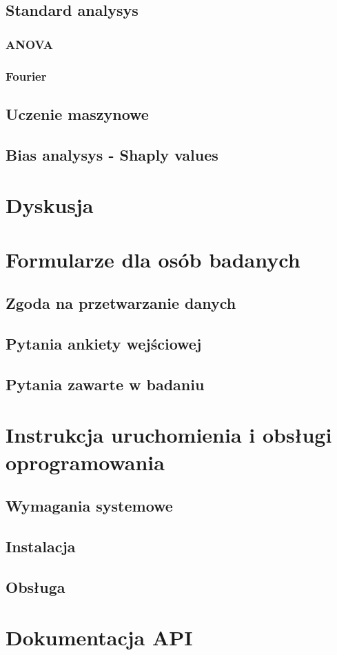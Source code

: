 \documentclass{./assets/wfis}
\begin{document}
\section{Standard analysys}\label{analiza-klasyczna}
\subsection{ANOVA}
\subsection{Fourier}
\section{Uczenie maszynowe}\label{uczenie-maszynowe}
\section{Bias analysys - Shaply values}\label{bias}

\chapter{Dyskusja}\label{dyskusja}

\appendix
\chapter{Formularze dla osób badanych}
\section{Zgoda na przetwarzanie danych}
\section{Pytania ankiety wejściowej}
\section{Pytania zawarte w badaniu}
\chapter{Instrukcja uruchomienia i obsługi oprogramowania}
\section{Wymagania systemowe}
\section{Instalacja}
\section{Obsługa}
\chapter{Dokumentacja API}

\printbibliography

\clearpage
\listoffigures
\clearpage
\listoftables
\clearpage
\end{document}
